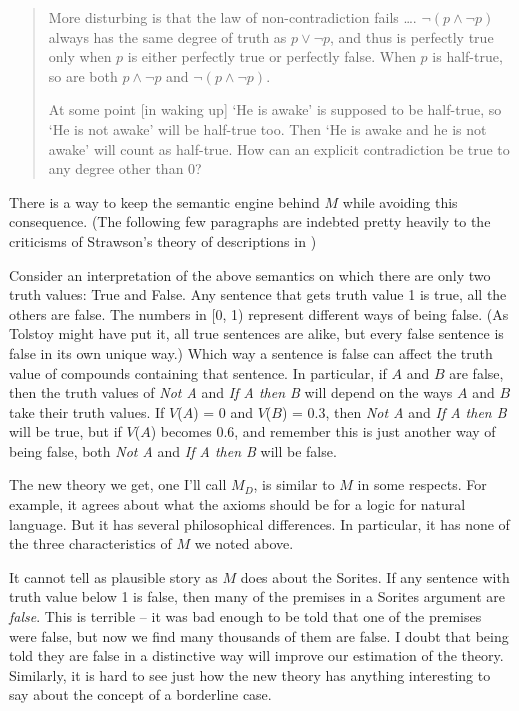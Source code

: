 \begin{quote}
More disturbing is that the law of non-contradiction fails {\ldots{}}.
\(\neg(p \wedge \neg p)\) always has the same degree of truth as
\(p \vee \neg p\), and thus is perfectly true only when \(p\) is either
perfectly true or perfectly false. When \(p\) is half-true, so are both
\(p \wedge \neg p\) and \(\neg(p \wedge \neg p)\).
\cite[118]{Williamson1994-WILV}

At some point {[}in waking up{]} `He is awake' is supposed to be
half-true, so `He is not awake' will be half-true too. Then `He is awake
and he is not awake' will count as half-true. How can an explicit
contradiction be true to any degree other than 0?
\cite[136]{Williamson1994-WILV}
\end{quote}

There is a way to keep the semantic engine behind \(M\) while avoiding
this consequence. (The following few paragraphs are indebted pretty
heavily to the criticisms of Strawson's theory of descriptions in
\citet{Dummett1959})

Consider an interpretation of the above semantics on which there are
only two truth values: True and False. Any sentence that gets truth
value 1 is true, all the others are false. The numbers in {[}0, 1)
represent different ways of being false. (As Tolstoy might have put it,
all true sentences are alike, but every false sentence is false in its
own unique way.) Which way a sentence is false can affect the truth
value of compounds containing that sentence. In particular, if \(A\) and
\(B\) are false, then the truth values of \emph{Not A} and \emph{If A
then B} will depend on the ways \(A\) and \(B\) take their truth values.
If \(V\)(\(A\)) = 0 and \(V\)(\(B\)) = 0.3, then \emph{Not A} and
\emph{If A then B} will be true, but if \(V\)(\(A\)) becomes 0.6, and
remember this is just another way of being false, both \emph{Not A} and
\emph{If A then B} will be false.

The new theory we get, one I'll call \(M_D\), is similar to \(M\) in
some respects. For example, it agrees about what the axioms should be
for a logic for natural language. But it has several philosophical
differences. In particular, it has none of the three characteristics of
\(M\) we noted above.

It cannot tell as plausible story as \(M\) does about the Sorites. If
any sentence with truth value below 1 is false, then many of the
premises in a Sorites argument are \emph{false}. This is terrible -- it
was bad enough to be told that one of the premises were false, but now
we find many thousands of them are false. I doubt that being told they
are false in a distinctive way will improve our estimation of the
theory. Similarly, it is hard to see just how the new theory has
anything interesting to say about the concept of a borderline case.

